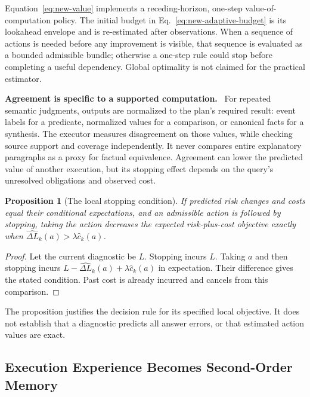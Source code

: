 \documentclass[10pt,twocolumn]{article}
\newcommand{\runin}[1]{\smallskip\noindent\textbf{#1.}\ }
\newtheorem{proposition}{Proposition}
\begin{document}
Equation~\eqref{eq:new-value} implements a receding-horizon,
one-step value-of-computation policy. The initial budget in
Eq.~\eqref{eq:new-adaptive-budget} is its lookahead envelope and is
re-estimated after observations. When a sequence of actions is needed
before any improvement is visible, that sequence is evaluated as a
bounded admissible bundle; otherwise a one-step rule could stop before
completing a useful dependency. Global optimality is not claimed for
the practical estimator.

\runin{Agreement is specific to a supported computation}
For repeated semantic judgments, outputs are normalized to the plan's
required result: event labels for a predicate, normalized values for
a comparison, or canonical facts for a synthesis. The executor measures
disagreement on those values, while checking source support and
coverage independently. It never compares entire explanatory paragraphs
as a proxy for factual equivalence. Agreement can lower the predicted
value of another execution, but its stopping effect depends on the
query's unresolved obligations and observed cost.

\begin{proposition}[The local stopping condition]
\label{prop:new-stopping}
If predicted risk changes and costs equal their conditional expectations,
and an admissible action is followed by stopping, taking the action
decreases the expected risk-plus-cost objective exactly when
$\widehat{\Delta L}_k(a)>\lambda\widehat c_k(a)$.
\end{proposition}
\begin{proof}
Let the current diagnostic be $L$. Stopping incurs $L$. Taking $a$
and then stopping incurs
$L-\widehat{\Delta L}_k(a)+\lambda\widehat c_k(a)$ in expectation.
Their difference gives the stated condition. Past cost is already
incurred and cancels from this comparison.
\end{proof}
The proposition justifies the decision rule for its specified local
objective. It does not establish that a diagnostic predicts all
answer errors, or that estimated action values are exact.

\subsection{Execution Experience Becomes Second-Order Memory}
\label{subsec:new-cost-experience}
\end{document}
